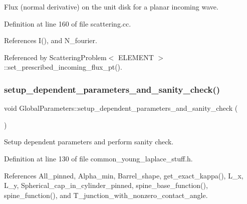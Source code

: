Flux (normal derivative) on the unit disk for a planar incoming wave. 



Definition at line 160 of file scattering.\+cc.



References I(), and N\+\_\+fourier.



Referenced by Scattering\+Problem$<$ E\+L\+E\+M\+E\+N\+T $>$\+::set\+\_\+prescribed\+\_\+incoming\+\_\+flux\+\_\+pt().

\mbox{\label{namespaceGlobalParameters_aedbc21f2c81d445634badfc5cdd77436}} 
\subsubsection{\texorpdfstring{setup\+\_\+dependent\+\_\+parameters\+\_\+and\+\_\+sanity\+\_\+check()}{setup\_dependent\_parameters\_and\_sanity\_check()}}
{\footnotesize\ttfamily void Global\+Parameters\+::setup\+\_\+dependent\+\_\+parameters\+\_\+and\+\_\+sanity\+\_\+check (\begin{DoxyParamCaption}{ }\end{DoxyParamCaption})}



Setup dependent parameters and perform sanity check. 



Definition at line 130 of file common\+\_\+young\+\_\+laplace\+\_\+stuff.\+h.



References All\+\_\+pinned, Alpha\+\_\+min, Barrel\+\_\+shape, get\+\_\+exact\+\_\+kappa(), L\+\_\+x, L\+\_\+y, Spherical\+\_\+cap\+\_\+in\+\_\+cylinder\+\_\+pinned, spine\+\_\+base\+\_\+function(), spine\+\_\+function(), and T\+\_\+junction\+\_\+with\+\_\+nonzero\+\_\+contact\+\_\+angle.

\mbox{\label{namespaceGlobalParameters_ac81daf87f8d3f075d9fd108427e70c4f}} 
